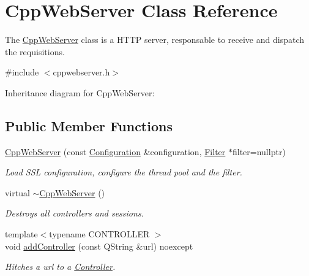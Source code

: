 \hypertarget{class_cpp_web_server}{}\section{Cpp\+Web\+Server Class Reference}
\label{class_cpp_web_server}


The \hyperlink{class_cpp_web_server}{Cpp\+Web\+Server} class is a H\+T\+TP server, responsable to receive and dispatch the requisitions.  




{\ttfamily \#include $<$cppwebserver.\+h$>$}



Inheritance diagram for Cpp\+Web\+Server\+:
\subsection*{Public Member Functions}
\begin{DoxyCompactItemize}
\item 
\hyperlink{class_cpp_web_server_a9c5598c541de45a40d2ebad698e9a616}{Cpp\+Web\+Server} (const \hyperlink{class_configuration}{Configuration} \&configuration, \hyperlink{class_filter}{Filter} $\ast$filter=nullptr)
\begin{DoxyCompactList}\small\item\em Load S\+SL configuration, configure the thread pool and the filter. \end{DoxyCompactList}\item 
\mbox{\label{class_cpp_web_server_a6b9d6874d16f6491c511fb4b8793a5f8}} 
virtual \hyperlink{class_cpp_web_server_a6b9d6874d16f6491c511fb4b8793a5f8}{$\sim$\+Cpp\+Web\+Server} ()
\begin{DoxyCompactList}\small\item\em Destroys all controllers and sessions. \end{DoxyCompactList}\item 
{\footnotesize template$<$typename C\+O\+N\+T\+R\+O\+L\+L\+ER $>$ }\\void \hyperlink{class_cpp_web_server_a3982d41728fd3237c42dd6dabbf1efb6}{add\+Controller} (const Q\+String \&url) noexcept
\begin{DoxyCompactList}\small\item\em Hitches a url to a \hyperlink{class_controller}{Controller}. \end{DoxyCompactList}\end{DoxyCompactItemize}
